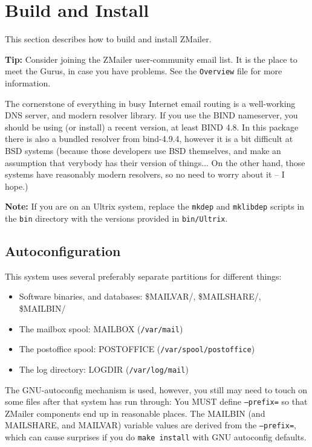 \section{Build and Install}

This section describes how to build and install ZMailer.

{\bf Tip:} Consider joining the ZMailer user-community email list.
It is the place to meet the Gurus, in case you have problems.
See the {\tt Overview} file for more information.

The cornerstone of everything in busy Internet email routing
is a well-working DNS server, and modern resolver library.
If you use the BIND nameserver, you should be using (or install)
a recent version, at least BIND 4.8. In this package there is also 
a bundled resolver from  bind-4.9.4, however it is a bit difficult at 
BSD systems (because those developers use BSD themselves, and make an 
assumption that verybody has their version of things...  On the other hand,
those systems have reasonably modern resolvers, so no need to worry about it
-- I hope.) 

{\bf Note:} If you are on an Ultrix system, replace the {\tt mkdep} and {\tt mklibdep}
scripts in the {\tt bin} directory with the versions provided in {\tt bin/Ultrix}.


\subsection{Autoconfiguration}

This system uses several preferably separate partitions for
different things:
\begin{itemize}
\item Software binaries, and databases: \$MAILVAR/, \$MAILSHARE/, \$MAILBIN/
\item The mailbox spool: MAILBOX ({\tt /var/mail})
\item The postoffice spool: POSTOFFICE ({\tt /var/spool/postoffice})
\item The log directory: LOGDIR ({\tt /var/log/mail})
\end{itemize}

The GNU-autoconfig mechanism is used, however, you still may need to
touch on some files after that system has run through:
You MUST define {\tt --prefix=} so that ZMailer components end up
in reasonable places.  The MAILBIN (and MAILSHARE, and MAILVAR)
variable values are derived from the {\tt --prefix=}, which can cause
surprises if you do {\tt make install} with GNU autoconfig defaults.

